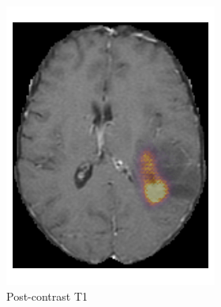 \begin{figure}[htbp]
\begin{subfigure}[b]{\textwidth}
\begin{subfigure}[b]{0.24\textwidth}
        \includegraphics[width=\textwidth]{Figures/saliency_LGG_T1GD.png}
        \caption*{Post-contrast \acrshort{T1}}
        \end{subfigure}
        \hfill
        \begin{subfigure}[b]{0.24\textwidth}

\end{subfigure}
\end{subfigure}
\end{figure}

